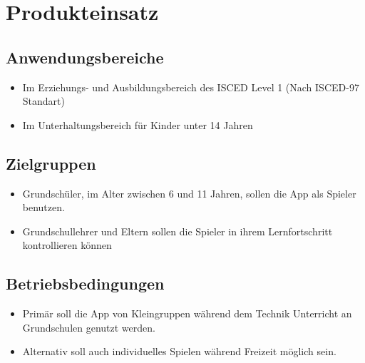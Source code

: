 \section{Produkteinsatz}

\subsection{Anwendungsbereiche}
\begin{itemize}
	\item Im Erziehungs- und Ausbildungsbereich des ISCED Level 1 (Nach ISCED-97 Standart)
	\item Im Unterhaltungsbereich für Kinder unter 14 Jahren
\end{itemize}


\subsection{Zielgruppen}

\begin{itemize}
	\item Grundschüler, im Alter zwischen 6 und 11 Jahren, sollen die App als Spieler benutzen.
	\item Grundschullehrer und Eltern sollen die Spieler in ihrem Lernfortschritt kontrollieren können
\end{itemize}

\subsection{Betriebsbedingungen}
\begin{itemize}
	\item Primär soll die App von Kleingruppen während dem Technik Unterricht an Grundschulen genutzt werden.
	\item Alternativ soll auch individuelles Spielen während Freizeit möglich sein.
\end{itemize}
